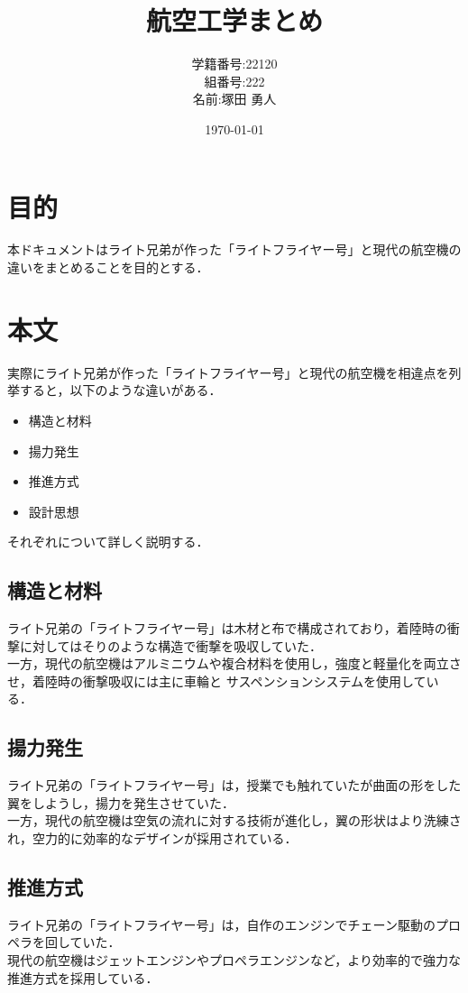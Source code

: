 \documentclass[a4paper,11pt,dvipdfmx]{jsarticle}
\begin{document}
\title{航空工学まとめ}
\author{学籍番号:22120 \\ 組番号:222 \\名前:塚田 勇人}
\date{\today}
\maketitle

\newpage

\section{目的}
本ドキュメントはライト兄弟が作った「ライトフライヤー号」と現代の航空機の違いをまとめることを目的とする．

\section{本文}
実際にライト兄弟が作った「ライトフライヤー号」と現代の航空機を相違点を列挙すると，以下のような違いがある．

\begin{itemize}
    \item 構造と材料
    \item 揚力発生
    \item 推進方式
    \item 設計思想
\end{itemize}

それぞれについて詳しく説明する．
\subsection{構造と材料}
ライト兄弟の「ライトフライヤー号」は木材と布で構成されており，着陸時の衝撃に対してはそりのような構造で衝撃を吸収していた．\\
一方，現代の航空機はアルミニウムや複合材料を使用し，強度と軽量化を両立させ，着陸時の衝撃吸収には主に車輪と
サスペンションシステムを使用している．

\subsection{揚力発生}
ライト兄弟の「ライトフライヤー号」は，授業でも触れていたが曲面の形をした翼をしようし，揚力を発生させていた．\\
一方，現代の航空機は空気の流れに対する技術が進化し，翼の形状はより洗練され，空力的に効率的なデザインが採用されている．

\subsection{推進方式}
ライト兄弟の「ライトフライヤー号」は，自作のエンジンでチェーン駆動のプロペラを回していた． \\
現代の航空機はジェットエンジンやプロペラエンジンなど，より効率的で強力な推進方式を採用している．
\end{document}
